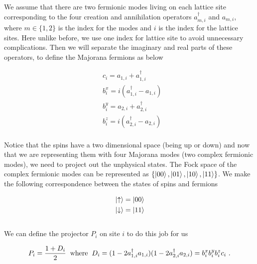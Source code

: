 \documentclass{article}
\begin{document}
We assume that there are two fermionic modes living on each lattice site corresponding to the four creation and annihilation operators $a^\dagger_{m,i}$ and $a_{m,i}$, where $m\in \{1,2\}$ is the index for the modes and $i$ is the index for the lattice sites. Here unlike before, we use one index for lattice site to avoid unnecessary complications. Then we will separate the imaginary and real parts of these operators, to define the Majorana fermions as below

\begin{equation}\label{eq:20}
    \begin{aligned}
        & c_i = a_{1,i} + a^\dagger_{1,i} \\
        & b^x_i = i(a^\dagger_{1,i} - a_{1,i}) \\
        & b^y_i = a_{2,i} + a^\dagger_{2,i} \\
        & b^z_i = i(a^\dagger_{2,i} - a_{2,i})
    \end{aligned}
\end{equation}{}\\

Notice that the spins have a two dimensional space (being up or down) and now that we are representing them with four Majorana modes (two complex fermionic modes), we need to project out the unphysical states. The Fock space of the complex fermionic modes can be represented as $\{\ket{00}, \ket{01}, \ket{10}, \ket{11}\}$. We make the following correspondence between the states of spins and fermions 

\begin{equation}\label{eq:21}
    \begin{aligned}
        & \ket{\uparrow} = \ket{00} \\
        & \ket{\downarrow} = \ket{11}
    \end{aligned}
\end{equation}{}\\

We can define the projector $P_i$ on site $i$ to do this job for us

\begin{equation}\label{eq:22}
    \begin{aligned}
        P_i = \frac{1+D_i}{2} \hspace{2mm}\text{where}\hspace{2mm} D_i = (1-2a^\dagger_{1,i}a_{1,i})(1-2a^\dagger_{2,i}a_{2,i}) = b^x_i b^y_i b^z_i c_i~.
    \end{aligned}
\end{equation}{}\\
\end{document}
